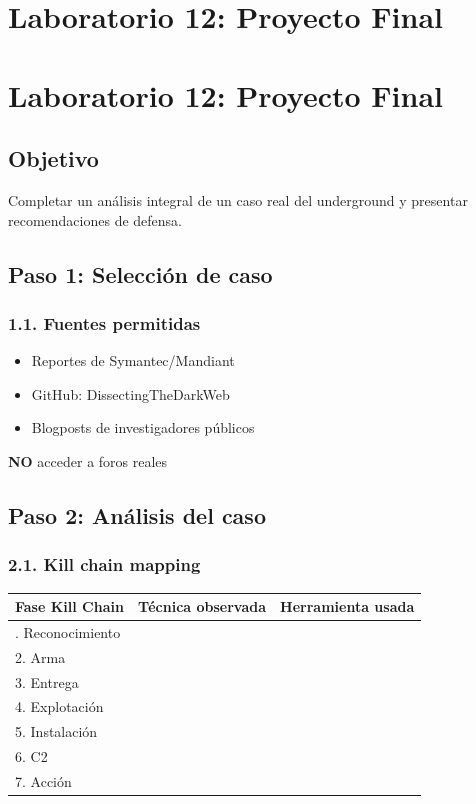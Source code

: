 \documentclass[
  letterpaper,
]{report}
\newcounter{none} %
\providecommand{\tightlist}{%
  \setlength{\itemsep}{0pt}\setlength{\parskip}{0pt}}
\begin{document}
\chapter{Laboratorio 12: Proyecto
Final}\label{laboratorio-12-proyecto-final}

\chapter{Laboratorio 12: Proyecto
Final}\label{laboratorio-12-proyecto-final-1}

\section{Objetivo}\label{objetivo-11}

Completar un análisis integral de un caso real del underground y
presentar recomendaciones de defensa.

\section{Paso 1: Selección de caso}\label{paso-1-selecciuxf3n-de-caso}

\subsection{1.1. Fuentes permitidas}\label{fuentes-permitidas}

\begin{itemize}
\tightlist
\item
  Reportes de Symantec/Mandiant
\item
  GitHub: DissectingTheDarkWeb
\item
  Blogposts de investigadores públicos
\end{itemize}

\textbf{NO} acceder a foros reales

\section{Paso 2: Análisis del caso}\label{paso-2-anuxe1lisis-del-caso}

\subsection{2.1. Kill chain mapping}\label{kill-chain-mapping}

{\def\LTcaptype{none} %
\begin{longtable}[]{@{}lll@{}}
\toprule\noalign{}
Fase Kill Chain & Técnica observada & Herramienta usada \\
\midrule\noalign{}
\endhead
\bottomrule\noalign{}
\endlastfoot
1. Reconocimiento & & \\
2. Arma & & \\
3. Entrega & & \\
4. Explotación & & \\
5. Instalación & & \\
6. C2 & & \\
7. Acción & & \\
\end{longtable}
}
\end{document}
